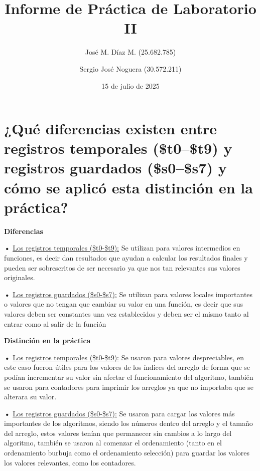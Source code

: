\documentclass{article}
\title{Informe de Práctica de Laboratorio II}
\author{José M. Díaz M. (25.682.785) \and Sergio José Noguera (30.572.211)}
\date{15 de julio de 2025}
\begin{document}
\maketitle






\section{¿Qué diferencias existen entre registros temporales (\$t0–\$t9) y registros guardados (\$s0–\$s7) y cómo se aplicó esta distinción en la práctica?}

\quad

\textbf{Diferencias }

\quad

\textbf{•   } \underline{ Los registros temporales (\$t0-\$t9):} { Se utilizan para valores intermedios en funciones, es decir dan resultados que ayudan a calcular los resultados finales y pueden ser sobrescritos de ser necesario ya que nos tan relevantes sus valores originales.}

\quad

\textbf{•   }  \underline{ Los registros guardados (\$s0-\$s7):} { Se utilizan para valores locales importantes o valores que no tengan que cambiar su valor en una función, es decir que sus valores deben ser constantes una vez establecidos y deben ser el mismo tanto al entrar como al salir de la función}

\quad

\textbf{Distinción en la práctica }

\quad

\textbf{•   } \underline{ Los registros temporales (\$t0-\$t9):} { Se usaron para valores despreciables, en este caso fueron útiles para los valores de los índices del arreglo de forma que se podían incrementar su valor sin afectar el funcionamiento del algoritmo, también se usaron para contadores para imprimir los arreglos ya que no importaba que se alterara su valor.}

\quad

\textbf{•   }  \underline{ Los registros guardados (\$s0-\$s7):} { Se usaron para cargar los valores más importantes de los algoritmos, siendo los números dentro del arreglo y el tamaño del arreglo, estos valores tenían que permanecer sin cambios a lo largo del algoritmo, también se usaron al comenzar el ordenamiento (tanto en el ordenamiento burbuja como el ordenamiento selección) para guardar los valores los valores relevantes, como los contadores.}
\end{document}
